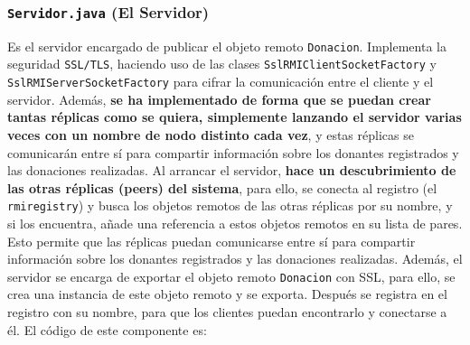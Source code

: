 \documentclass[a4paper,12pt]{article}
\begin{document}
			\subsubsection{\texttt{Servidor.java} (El Servidor)}
				Es el servidor encargado de publicar el objeto remoto \texttt{Donacion}. Implementa la seguridad \texttt{SSL/TLS}, haciendo uso de las clases \texttt{SslRMIClientSocketFactory} y \texttt{SslRMIServerSocketFactory} para cifrar la comunicación entre el cliente y el servidor. Además, \textbf{se ha implementado de forma que se puedan crear tantas réplicas como se quiera, simplemente lanzando el servidor varias veces con un nombre de nodo distinto cada vez}, y estas réplicas se comunicarán entre sí para compartir información sobre los donantes registrados y las donaciones realizadas. 
				Al arrancar el servidor, \textbf{hace un descubrimiento de las otras réplicas (peers) del sistema}, para ello, se conecta al registro (el \texttt{rmiregistry}) y busca los objetos remotos de las otras réplicas por su nombre, y si los encuentra, añade una referencia a estos objetos remotos en su lista de pares. Esto permite que las réplicas puedan comunicarse entre sí para compartir información sobre los donantes registrados y las donaciones realizadas.
				Además, el servidor se encarga de exportar el objeto remoto \texttt{Donacion} con SSL, para ello, se crea una instancia de este objeto remoto y se exporta. Después se registra en el registro con su nombre, para que los clientes puedan encontrarlo y conectarse a él.
				El código de este componente es:

				\inputminted[linenos, frame=lines, fontsize=\scriptsize]{Java}{../codigo/Parte_2_Servidor_Replicado/Servidor.java}					 
	
\end{document}
